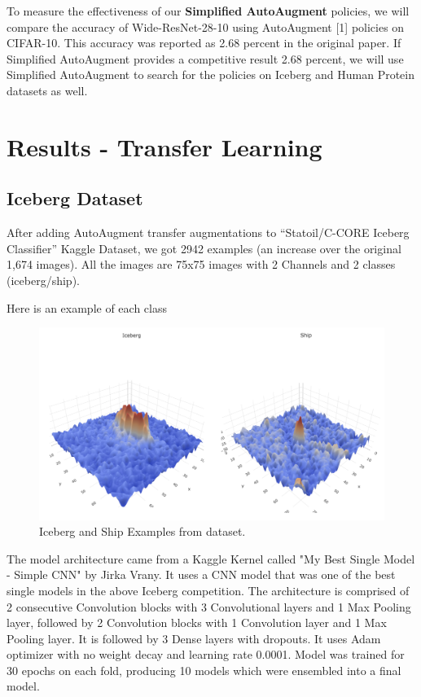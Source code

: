 \documentclass[10pt,twocolumn,letterpaper]{article}
\begin{document}
To measure the effectiveness of our \textbf{Simplified AutoAugment} policies, we will compare the accuracy of Wide-ResNet-28-10 using AutoAugment [1] policies on CIFAR-10.  This accuracy was reported as 2.68 percent in the original paper.  If Simplified AutoAugment provides a competitive result 2.68 percent, we will use Simplified AutoAugment to search for the policies on Iceberg and Human Protein datasets as well.



\section{Results - Transfer Learning}

\subsection{Iceberg Dataset}

After adding AutoAugment transfer augmentations to “Statoil/C-CORE Iceberg Classifier” Kaggle Dataset, we got 2942 examples (an increase over the original 1,674 images). All the images are 75x75 images with 2 Channels and 2 classes (iceberg/ship).

Here is an example of each class 

\begin{figure}[bhp]
\includegraphics[width=\columnwidth]{iceberg_ship_example.png}
\caption{Iceberg and Ship Examples from dataset.}
\end{figure}

The model architecture came from a Kaggle Kernel called "My Best Single Model - Simple CNN" by Jirka Vrany.  It uses a CNN model that was one of the best single models in the above Iceberg competition. The architecture is comprised of 2 consecutive Convolution blocks with 3 Convolutional layers and 1 Max Pooling layer, followed by 2 Convolution blocks with 1 Convolution layer and 1 Max Pooling layer. It is followed by 3 Dense layers with dropouts. It uses Adam optimizer with no weight decay and learning rate 0.0001. Model was trained for 30 epochs on each fold, producing 10 models which were ensembled into a final model.  
\end{document}
